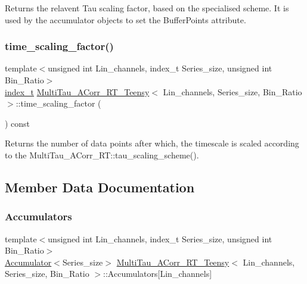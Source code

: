 Returns the relavent Tau scaling factor, based on the specialised scheme. It is used by the accumulator objects to set the Buffer\+Points attribute. 

\mbox{\label{classMultiTau__ACorr__RT__Teensy_a218fdc2fcc3bb7cd5d1c2f03ea2506da}} 
\subsubsection{\texorpdfstring{time\+\_\+scaling\+\_\+factor()}{time\_scaling\_factor()}}
{\footnotesize\ttfamily template$<$unsigned int Lin\+\_\+channels, index\+\_\+t Series\+\_\+size, unsigned int Bin\+\_\+\+Ratio$>$ \\
\hyperlink{types_8hpp_a7c40bb931c31595ed6308605f4537447}{index\+\_\+t} \hyperlink{classMultiTau__ACorr__RT__Teensy}{Multi\+Tau\+\_\+\+A\+Corr\+\_\+\+R\+T\+\_\+\+Teensy}$<$ Lin\+\_\+channels, Series\+\_\+size, Bin\+\_\+\+Ratio $>$\+::time\+\_\+scaling\+\_\+factor (\begin{DoxyParamCaption}{ }\end{DoxyParamCaption}) const\hspace{0.3cm}{\ttfamily [inline]}}

Returns the number of data points after which, the timescale is scaled according to the Multi\+Tau\+\_\+\+A\+Corr\+\_\+\+R\+T\+::tau\+\_\+scaling\+\_\+scheme(). 

\subsection{Member Data Documentation}
\mbox{\label{classMultiTau__ACorr__RT__Teensy_a1ad4057e0ab46e2919bfee2ba619113b}} 
\subsubsection{\texorpdfstring{Accumulators}{Accumulators}}
{\footnotesize\ttfamily template$<$unsigned int Lin\+\_\+channels, index\+\_\+t Series\+\_\+size, unsigned int Bin\+\_\+\+Ratio$>$ \\
\hyperlink{classAccumulator}{Accumulator}$<$Series\+\_\+size$>$ \hyperlink{classMultiTau__ACorr__RT__Teensy}{Multi\+Tau\+\_\+\+A\+Corr\+\_\+\+R\+T\+\_\+\+Teensy}$<$ Lin\+\_\+channels, Series\+\_\+size, Bin\+\_\+\+Ratio $>$\+::Accumulators\mbox{[}Lin\+\_\+channels\mbox{]}\hspace{0.3cm}{\ttfamily [private]}}

